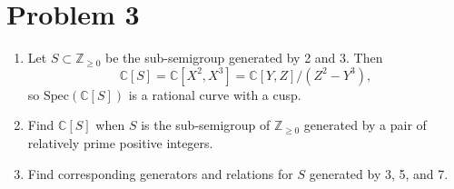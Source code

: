 \documentclass[12pt, a4paper]{article}
\begin{document}
\section*{Problem 3}
\begin{enumerate}
    \item[(a)] Let $S \subset \mathbb{Z}_{\ge 0}$ be the sub-semigroup generated by 2 and 3. Then
    \[
    \mathbb{C}[S] = \mathbb{C}[X^{2}, X^{3}] = \mathbb{C}[Y, Z] / (Z^{2} - Y^{3}),
    \]
    so $\text{Spec}(\mathbb{C}[S])$ is a rational curve with a cusp.
    
    \item[(b)] Find $\mathbb{C}[S]$ when $S$ is the sub-semigroup of $\mathbb{Z}_{\ge 0}$ generated by a pair of relatively prime positive integers.
    
    \item[(c)] Find corresponding generators and relations for $S$ generated by 3, 5, and 7.
\end{enumerate}
\end{document}
